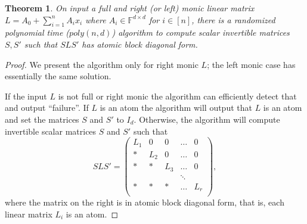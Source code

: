 \documentclass[10pt,a4paper]{article}
\newtheorem{theorem}{Theorem}[section]
\begin{document}
\begin{theorem}\label{lfact2}
On input a full and right (or left) monic linear matrix $L= A_0 +
\sum_{i=1}^n A_i x_i$ where $A_i \in \mathbb{F}^{d \times d}$ for $i\in
    [n]$, there is a randomized polynomial time ($poly(n,d)$)
    algorithm to compute scalar invertible matrices $S,S'$ such that
    $SLS'$ has atomic block diagonal form.
\end{theorem}

\begin{proof}
  We present the algorithm only for right monic $L$; the left monic
  case has essentially the same solution.

  If the input $L$ is not full or right monic the algorithm can
  efficiently detect that and output ``failure''. If $L$ is an atom
  the algorithm will output that $L$ is an atom and set the matrices
  $S$ and $S'$ to $I_d$. Otherwise, the algorithm will compute
  invertible scalar matrices $S$ and $S'$ such that
\begin{equation}\label{eq-block-atom}
S L S' = 
\left(
\begin{array}{ccccc}
L_1 & 0 &0 &\ldots & 0\\
* & L_2 &0 &\ldots & 0\\
* & * &L_3 &\ldots & 0\\
& & &\ddots &\\
* & * &* &\ldots & L_r\\
\end{array}
\right),
\end{equation}
where the matrix on the right is in atomic block diagonal form, that
is, each linear matrix $L_i$ is an atom.


\end{proof}
\end{document}
